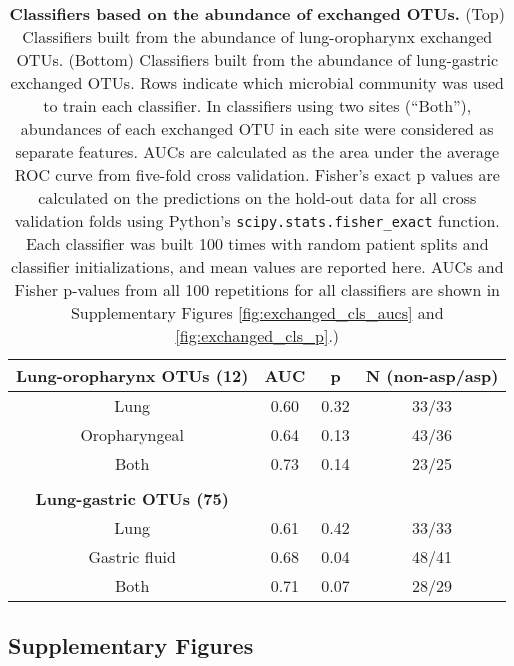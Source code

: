 \begin{table}
\begin{center}

\begin{tabular}{cccc}
\textbf{Lung-oropharynx OTUs (12)} & AUC & p & N (non-asp/asp) \\
\midrule
Lung & 0.60 & 0.32 & 33/33 \\
Oropharyngeal & 0.64 & 0.13 & 43/36 \\
Both & 0.73 & 0.14 & 23/25 \\
\bottomrule
\\
\textbf{Lung-gastric OTUs (75)} &  & & \\
\midrule
Lung & 0.61 & 0.42 & 33/33 \\
Gastric fluid & 0.68 & 0.04 & 48/41 \\
Both & 0.71 & 0.07 & 28/29 \\
\bottomrule
\end{tabular}
\caption{\textbf{Classifiers based on the abundance of exchanged OTUs.} (Top) Classifiers built from the abundance of lung-oropharynx exchanged OTUs. (Bottom) Classifiers built from the abundance of lung-gastric exchanged OTUs. Rows indicate which microbial community was used to train each classifier. In classifiers using two sites (``Both''), abundances of each exchanged OTU in each site were considered as separate features. AUCs are calculated as the area under the average ROC curve from five-fold cross validation. Fisher's exact p values are calculated on the predictions on the hold-out data for all cross validation folds using Python's \texttt{scipy.stats.fisher\_exact} function. Each classifier was built 100 times with random patient splits and classifier initializations, and mean values are reported here. AUCs and Fisher p-values from all 100 repetitions for all classifiers are shown in Supplementary Figures \ref{fig:exchanged_cls_aucs} and \ref{fig:exchanged_cls_p}.)}\label{tab:abun-exchange-classifiers}
\end{center}
\end{table}

\newpage
\FloatBarrier

\subsection{Supplementary Figures}

